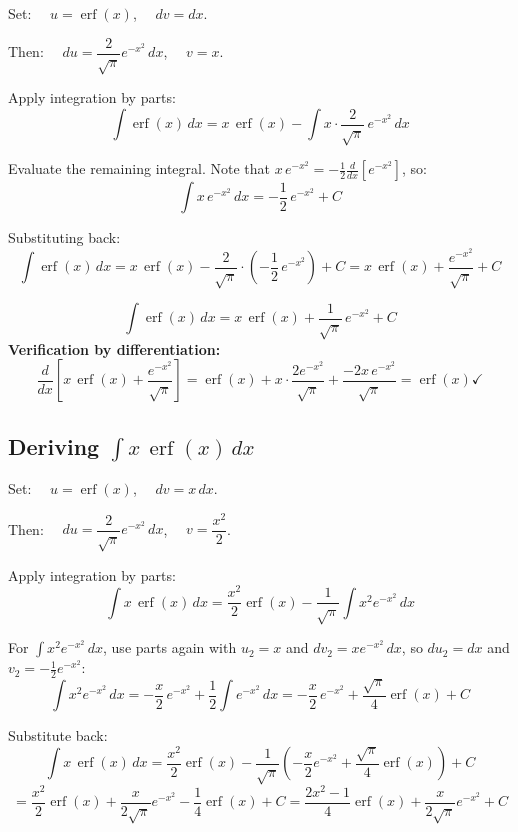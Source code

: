 \documentclass[11pt]{article}
\begin{document}
\begin{methodbox}
Set: $\quad u = \operatorname{erf}(x)$, $\quad dv = dx$.

Then: $\quad du = \dfrac{2}{\sqrt{\pi}}e^{-x^2}\,dx$, $\quad v = x$.

Apply integration by parts:
\[
\int \operatorname{erf}(x)\,dx = x\,\operatorname{erf}(x) - \int x \cdot \frac{2}{\sqrt{\pi}}\,e^{-x^2}\,dx
\]

Evaluate the remaining integral. Note that $x\,e^{-x^2} = -\frac{1}{2}\frac{d}{dx}[e^{-x^2}]$, so:
\[
\int x\,e^{-x^2}\,dx = -\frac{1}{2}\,e^{-x^2} + C
\]

Substituting back:
\[
\int \operatorname{erf}(x)\,dx = x\,\operatorname{erf}(x) - \frac{2}{\sqrt{\pi}}\cdot\left(-\frac{1}{2}\,e^{-x^2}\right) + C = x\,\operatorname{erf}(x) + \frac{e^{-x^2}}{\sqrt{\pi}} + C
\]
\end{methodbox}

\begin{theorembox}
\[
\int \operatorname{erf}(x)\,dx = x\,\operatorname{erf}(x) + \frac{1}{\sqrt{\pi}}\,e^{-x^2} + C
\]
\textbf{Verification by differentiation:}
\[
\frac{d}{dx}\!\left[x\,\operatorname{erf}(x) + \frac{e^{-x^2}}{\sqrt{\pi}}\right] = \operatorname{erf}(x) + x\cdot\frac{2e^{-x^2}}{\sqrt{\pi}} + \frac{-2x\,e^{-x^2}}{\sqrt{\pi}} = \operatorname{erf}(x) \checkmark
\]
\end{theorembox}

\subsection{Deriving $\int x\,\operatorname{erf}(x)\,dx$}

\begin{methodbox}
Set: $\quad u = \operatorname{erf}(x)$, $\quad dv = x\,dx$.

Then: $\quad du = \dfrac{2}{\sqrt{\pi}}e^{-x^2}\,dx$, $\quad v = \dfrac{x^2}{2}$.

Apply integration by parts:
\[
\int x\,\operatorname{erf}(x)\,dx = \frac{x^2}{2}\operatorname{erf}(x) - \frac{1}{\sqrt{\pi}}\int x^2 e^{-x^2}\,dx
\]

For $\int x^2 e^{-x^2}\,dx$, use parts again with $u_2 = x$ and $dv_2 = xe^{-x^2}\,dx$, so $du_2 = dx$ and $v_2 = -\frac{1}{2}e^{-x^2}$:
\[
\int x^2 e^{-x^2}\,dx = -\frac{x}{2}\,e^{-x^2} + \frac{1}{2}\int e^{-x^2}\,dx = -\frac{x}{2}\,e^{-x^2} + \frac{\sqrt{\pi}}{4}\operatorname{erf}(x) + C
\]

Substitute back:
\[
\int x\,\operatorname{erf}(x)\,dx = \frac{x^2}{2}\operatorname{erf}(x) - \frac{1}{\sqrt{\pi}}\!\left(-\frac{x}{2}e^{-x^2} + \frac{\sqrt{\pi}}{4}\operatorname{erf}(x)\right) + C
\]
\[
= \frac{x^2}{2}\operatorname{erf}(x) + \frac{x}{2\sqrt{\pi}}e^{-x^2} - \frac{1}{4}\operatorname{erf}(x) + C = \frac{2x^2-1}{4}\operatorname{erf}(x) + \frac{x}{2\sqrt{\pi}}e^{-x^2} + C
\]
\end{methodbox}
\end{document}
